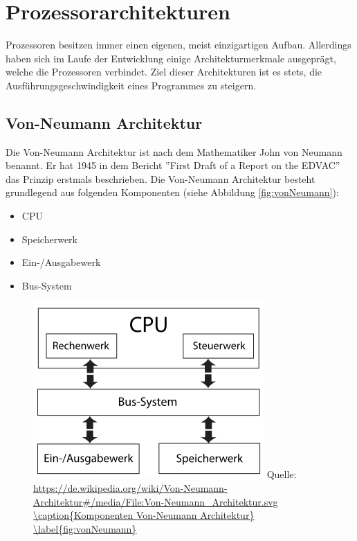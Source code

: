 \documentclass[12pt]{article}
\begin{document}
\newpage
\section{Prozessorarchitekturen}
Prozessoren besitzen immer einen eigenen, meist einzigartigen Aufbau. Allerdings haben sich im Laufe der Entwicklung einige Architekturmerkmale ausgeprägt, welche die Prozessoren verbindet. 
Ziel dieser Architekturen ist es stets, die Ausführungsgeschwindigkeit eines Programmes zu steigern.
\subsection{Von-Neumann Architektur}
Die Von-Neumann Architektur ist nach dem Mathematiker John von Neumann benannt. Er hat 1945 in dem Bericht ''First Draft of a Report on the EDVAC'' das Prinzip erstmals beschrieben.
Die Von-Neumann Architektur besteht grundlegend aus folgenden Komponenten \cite{von1993first} (siehe Abbildung \ref{fig:vonNeumann}):
\begin{samepage}
\begin{itemize}
\item CPU 
\item Speicherwerk 
\item Ein-/Ausgabewerk
\item Bus-System
\end{itemize}
\end{samepage}


\begin{figure}[!htb]
\centering
\includegraphics[scale=0.60]{Von-Neumann_Architektur}
\small Quelle: \url{https://de.wikipedia.org/wiki/Von-Neumann-Architektur#/media/File:Von-Neumann_Architektur.svg
\caption{Komponenten Von-Neumann Architektur}
\label{fig:vonNeumann}}
\end{figure}
\end{document}
